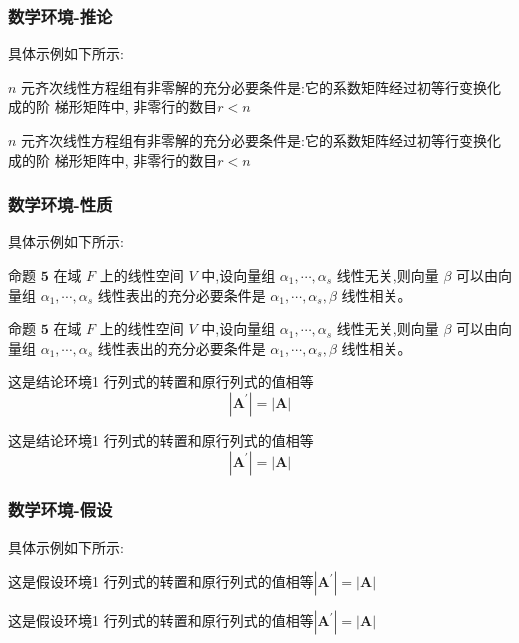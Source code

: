 \subsubsection{数学环境-推论}
具体示例如下所示:
\begin{corollary}
    $n$ 元齐次线性方程组有非零解的充分必要条件是:它的系数矩阵经过初等行变换化成的阶
    梯形矩阵中, 非零行的数目$r<n$
\end{corollary}

\begin{tcblisting}{}
\begin{corollary}
    $n$ 元齐次线性方程组有非零解的充分必要条件是:它的系数矩阵经过初等行变换化成的阶
    梯形矩阵中, 非零行的数目$r<n$
\end{corollary}
\end{tcblisting}

\subsubsection{数学环境-性质}
具体示例如下所示:
\begin{property}
    命题 $\mathbf{5}$ 在域 $F$ 上的线性空间 $V$ 中,设向量组 $\alpha_{1}, \cdots, \alpha_{s}$ 线性无关,则向量 $\beta$ 可以由向 量组 $\alpha_{1}, \cdots, \alpha_{s}$ 线性表出的充分必要条件是 $\alpha_{1}, \cdots, \alpha_{s}, \beta$ 线性相关。
\end{property}
\begin{tcblisting}{}
\begin{property}
    命题 $\mathbf{5}$ 在域 $F$ 上的线性空间 $V$ 中,设向量组 $\alpha_{1}, \cdots, \alpha_{s}$ 线性无关,则向量 $\beta$ 可以由向 量组 $\alpha_{1}, \cdots, \alpha_{s}$ 线性表出的充分必要条件是 $\alpha_{1}, \cdots, \alpha_{s}, \beta$ 线性相关。
\end{property}
\end{tcblisting}

\begin{conclusion}
    这是结论环境1 行列式的转置和原行列式的值相等
    $$\left|\boldsymbol{A}^{\prime}\right|=|\boldsymbol{A}|$$
\end{conclusion}
\begin{tcblisting}{}
\begin{conclusion}
    这是结论环境1 行列式的转置和原行列式的值相等
    $$\left|\boldsymbol{A}^{\prime}\right|=|\boldsymbol{A}|$$
\end{conclusion}
\end{tcblisting}

\subsubsection{数学环境-假设}
具体示例如下所示:
\begin{tcblisting}{}
\begin{assumption}[类型二]
    这是假设环境1 行列式的转置和原行列式的值相等$\left|\boldsymbol{A}^{\prime}\right|=|\boldsymbol{A}|$
\end{assumption}
\end{tcblisting}
\begin{assumption}[类型二]
    这是假设环境1 行列式的转置和原行列式的值相等$\left|\boldsymbol{A}^{\prime}\right|=|\boldsymbol{A}|$
\end{assumption}
